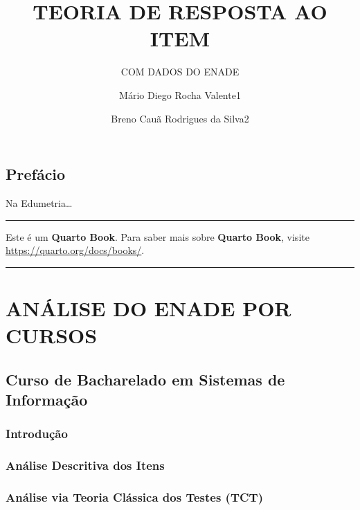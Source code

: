 \documentclass[
  portuguese,
  11pt,
  a4paper,
  DIV=11,
  numbers=noendperiod]{scrreprt}
\title{TEORIA DE RESPOSTA AO ITEM}
\subtitle{COM DADOS DO ENADE}
\author{Mário Diego Rocha Valente1 \and Breno Cauã Rodrigues da Silva2}
\date{}
\renewcommand*\contentsname{Índice}
\newcommand\contentsname{Índice}
\begin{document}
\maketitle

\renewcommand*\contentsname{Índice}
{
\hypersetup{linkcolor=}
\setcounter{tocdepth}{2}
\tableofcontents
}


\chapter*{Prefácio}\label{prefuxe1cio}


Na Edumetria\ldots{}

\begin{center}\rule{0.5\linewidth}{0.5pt}\end{center}

Este é um \textbf{Quarto Book}. Para saber mais sobre \textbf{Quarto
Book}, visite \url{https://quarto.org/docs/books/}.

\begin{center}\rule{0.5\linewidth}{0.5pt}\end{center}

\part{ANÁLISE DO ENADE POR CURSOS}


\chapter{Curso de Bacharelado em Sistemas de
Informação}\label{curso-de-bacharelado-em-sistemas-de-informauxe7uxe3o}

\section{Introdução}\label{introduuxe7uxe3o}

\section{Análise Descritiva dos
Itens}\label{anuxe1lise-descritiva-dos-itens}

\section{Análise via Teoria Clássica dos Testes
(TCT)}\label{anuxe1lise-via-teoria-cluxe1ssica-dos-testes-tct}
\end{document}

